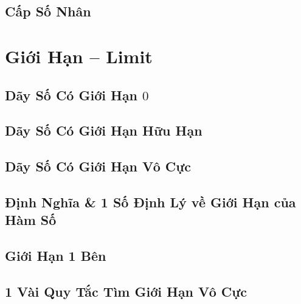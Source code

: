 \documentclass[oneside]{book}
\numberwithin{equation}{section}
\begin{document}

\section{Cấp Số Nhân}


\chapter{Giới Hạn -- Limit}

\section{Dãy Số Có Giới Hạn $0$}


\section{Dãy Số Có Giới Hạn Hữu Hạn}


\section{Dãy Số Có Giới Hạn Vô Cực}


\section{Định Nghĩa \& 1 Số Định Lý về Giới Hạn của Hàm Số}


\section{Giới Hạn 1 Bên}


\section{1 Vài Quy Tắc Tìm Giới Hạn Vô Cực}
\end{document}
